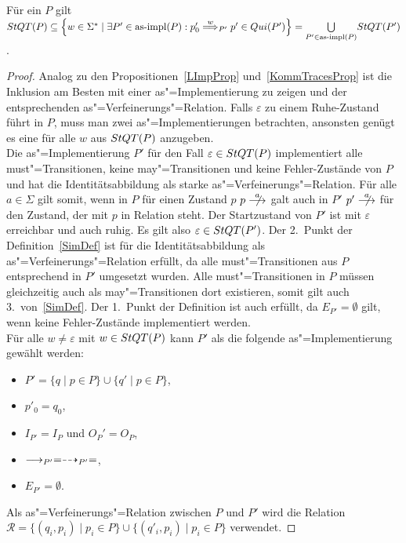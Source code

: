 \begin{Prop}
  \label{QuiTraceProp}
  Für ein \MEIO{} $P$ gilt $\StQT (P) \subseteq \left\{w\in\Sigma ^*\mid
  \exists P'\in\asimp (P): p'_0 \weakmust[w]_{P'} p'\in Qui(P')\right\} =
  \underset{P'\in\asimp (P)}{\bigcup} \StQT (P')$.
\end{Prop}
\begin{proof}
  Analog zu den Propositionen~\ref{LImpProp} und~\ref{KommTracesProp} ist die
  Inklusion am Besten mit einer as"=Implementierung zu zeigen und der
  entsprechenden as"=Verfeinerungs"=Relation. Falls $\varepsilon$ zu einem
  Ruhe-Zustand führt in $P$, muss man zwei as"=Implementierungen betrachten,
  ansonsten genügt es eine für alle $w$ aus $StQT (P)$ anzugeben.\\
  Die as"=Implementierung $P'$ für den Fall $\varepsilon\in StQT (P)$
  implementiert alle must"=Transitionen, keine may"=Transitionen und keine
  Fehler-Zustände von $P$ und hat die Identitätsabbildung als starke
  as"=Verfeinerungs"=Relation. Für alle $a\in\Sigma$ gilt somit, wenn in $P$
  für einen Zustand $p$ $p\nmust[a]$ galt auch in $P'$ $p'\nmust[a]$ für den
  Zustand, der mit $p$ in Relation steht. Der Startzustand von $P'$ ist mit
  $\varepsilon$ erreichbar und auch ruhig. Es gilt also $\varepsilon\in StQT
  (P')$. Der 2.\ Punkt der Definition~\ref{SimDef} ist für die
  Identitätsabbildung als as"=Verfeinerungs"=Relation erfüllt, da alle
  must"=Transitionen aus $P$ entsprechend in $P'$ umgesetzt wurden. Alle
  must"=Transitionen in $P$ müssen gleichzeitig auch als may"=Transitionen dort
  existieren, somit gilt auch 3.\ von~\ref{SimDef}. Der 1.\ Punkt der
  Definition ist auch erfüllt, da $E_{P'}=\emptyset$ gilt, wenn keine
  Fehler-Zustände implementiert werden.\\
  Für alle $w\neq \varepsilon$ mit $w\in StQT (P)$ kann $P'$ als die folgende
  as"=Implementierung gewählt werden:
  \begin{itemize}
    \item $P'= \{q\mid p\in P\} \cup \{q'\mid p\in P\}$,
    \item $p'_0=q_0$,
    \item $I_{P'}=I_P$ und $O_P'=O_P$,
    \item $\must _{P'}=\may _{P'} =$,
    \item $E_{P'}=\emptyset$.
  \end{itemize}
  Als as"=Verfeinerungs"=Relation zwischen $P$ und $P'$ wird die Relation
  $\mathcal{R}=\{(q_i,p_i)\mid p_i\in P\} \cup \{(q'_i,p_i)\mid p_i\in P\}$
  verwendet.




\end{proof}
